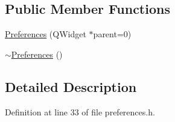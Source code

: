 \subsection*{Public Member Functions}
\begin{DoxyCompactItemize}
\item 
\hyperlink{classPreferences_a3fc460c1a11115945b78b2d35d7ade00}{Preferences} (QWidget $\ast$parent=0)
\item 
\hyperlink{classPreferences_a20020f4fceeefb048a5eeddec6c28376}{$\sim$Preferences} ()
\end{DoxyCompactItemize}


\subsection{Detailed Description}


Definition at line 33 of file preferences.h.



